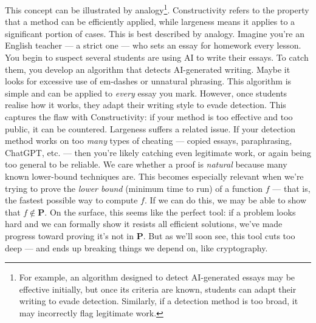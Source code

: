 \documentclass[12pt]{report}
\begin{document}
This concept can be illustrated by analogy\footnote{For example, an algorithm designed to detect AI-generated essays may be effective initially, but once its criteria are known, students can adapt their writing to evade detection. Similarly, if a detection method is too broad, it may incorrectly flag legitimate work.}. 
Constructivity refers to the property that a method can be efficiently applied, while largeness means it applies to a significant portion of cases.
This is best described by analogy.  
Imagine you're an English teacher --- a strict one --- who sets an essay for homework every lesson. You begin to suspect several students are using AI to write their essays.  
To catch them, you develop an algorithm that detects AI-generated writing.
Maybe it looks for excessive use of em-dashes or unnatural phrasing.
This algorithm is simple and can be applied to \textit{every} essay you mark.  
However, once students realise how it works, they adapt their writing style to evade detection.  
This captures the flaw with Constructivity: if your method is too effective and too public, it can be countered.
Largeness suffers a related issue. If your detection method works on too \textit{many} types of cheating --- copied essays, paraphrasing, ChatGPT, etc. --- then you're likely catching even legitimate work, or again being too general to be reliable.
\vspace{0.5cm}
\newline
We care whether a proof is \textit{natural} because many known lower-bound techniques are.  
This becomes especially relevant when we're trying to prove the \textit{lower bound} (minimum time to run) of a function $f$ --- that is, the fastest possible way to compute $f$.  
If we can do this, we may be able to show that $f \notin \mathbf{P}$.
\vspace{0.5cm}
\newline
On the surface, this seems like the perfect tool: if a problem looks hard and we can formally show it resists all efficient solutions, we've made progress toward proving it's not in $\mathbf{P}$.
But as we'll soon see, this tool cuts too deep --- and ends up breaking things we depend on, like cryptography.
\end{document}
